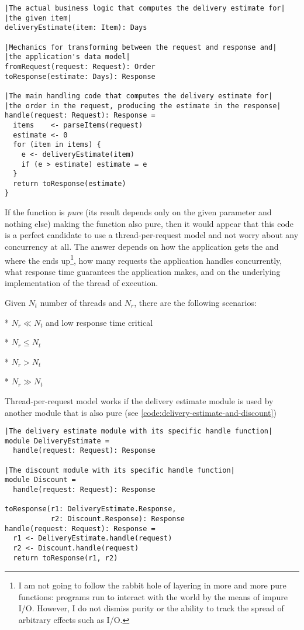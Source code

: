 \begin{lstlisting}[caption={Delivery estimate}, label={code:delivery-estimate}, language=Pseudo, escapechar=|]
|The actual business logic that computes the delivery estimate for|
|the given item|
deliveryEstimate(item: Item): Days

|Mechanics for transforming between the request and response and|
|the application's data model|
fromRequest(request: Request): Order
toResponse(estimate: Days): Response

|The main handling code that computes the delivery estimate for|
|the order in the request, producing the estimate in the response|
handle(request: Request): Response = 
  items    <- parseItems(request)
  estimate <- 0
  for (item in items) {
    e <- deliveryEstimate(item)
    if (e > estimate) estimate = e
  }
  return toResponse(estimate)
}
\end{lstlisting}

If the  function is \emph{pure} (its result depends only on the given parameter and nothing else) making the  function also pure, then it would appear that this code is a perfect candidate to use a thread-per-request model and not worry about any concurrency at all. The answer depends on how the application gets the  and where the  ends up\footnote{I am not going to follow the rabbit hole of layering in more and more pure functions: programs run to interact with the world by the means of impure I/O. However, I do not dismiss purity or the ability to track the spread of arbitrary effects such as I/O.}, how many requests the application handles concurrently, what response time guarantees the application makes, and on the underlying implementation of the thread of execution.

Given $N_{t}$ number of threads and $N_{r}$, there are the following scenarios:

* $N_{r} \ll N_{t}$ and low response time critical

* $N_{r} \le N_{t}$ 

* $N_{r} > N_{t}$

* $N_{r} \gg N_{t}$

Thread-per-request model works if the delivery estimate module is used by another module that is also pure (see \autoref{code:delivery-estimate-and-discount})

\begin{lstlisting}[caption={Delivery and discount}, label={code:delivery-estimate-and-discount}, language=Pseudo, escapechar=|]
|The delivery estimate module with its specific handle function|
module DeliveryEstimate =
  handle(request: Request): Response

|The discount module with its specific handle function|
module Discount =
  handle(request: Request): Response

toResponse(r1: DeliveryEstimate.Response,
           r2: Discount.Response): Response
handle(request: Request): Response = 
  r1 <- DeliveryEstimate.handle(request)
  r2 <- Discount.handle(request)
  return toResponse(r1, r2)

\end{lstlisting}

